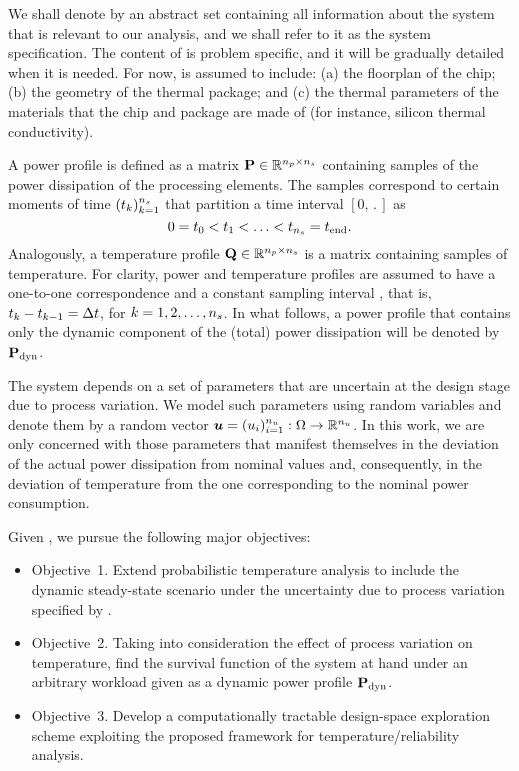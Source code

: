 We shall denote by \spec an abstract set containing all information
about the system that is relevant to our analysis, and we shall refer to it as
the system specification. The content of \spec is problem specific,
and it will be gradually detailed when it is needed. For now, \spec
is assumed to include: (a) the floorplan of the chip; (b) the geometry of the
thermal package; and (c) the thermal parameters of the materials that the chip
and package are made of (for instance, silicon thermal conductivity).

A power profile is defined as a matrix $\mathbf{P} \in \mathbb{R}^{{n_{p}} \times {n_{s}}}$
containing \ns samples of the power dissipation of the processing elements. The
samples correspond to certain moments of time $(t_k)_{k = 1}^{n_{s}}$ that partition
a time interval $[0, \period]$ as
\[
  0 = t_0 < t_1 < \dotsc < t_{n_{s}} = t_\mathrm{end}.
\]
Analogously, a temperature profile $\mathbf{Q} \in \mathbb{R}^{{n_{p}} \times {n_{s}}}$ is a matrix
containing samples of temperature. For clarity, power and temperature profiles
are assumed to have a one-to-one correspondence and a constant sampling interval
\dt, that is, $t_k - t_{k - 1} = \Delta t$, for $k = 1, 2, \dots, {n_{s}}$. In what
follows, a power profile that contains only the dynamic component of the (total)
power dissipation will be denoted by $\mathbf{P}_{\mathrm{dyn}}$.

The system depends on a set of parameters that are uncertain at the design stage
due to process variation. We model such parameters using random variables and
denote them by a random vector $\boldsymbol{u} = (u_i)_{i = 1}^{n_{u}}: \Omega \to \mathbb{R}^{n_{u}}$.
In this work, we are only concerned with those parameters that manifest
themselves in the deviation of the actual power dissipation from nominal values
and, consequently, in the deviation of temperature from the one corresponding to
the nominal power consumption.

Given \spec, we pursue the following major objectives:
\begin{itemize}

  \item Objective~1. Extend probabilistic temperature analysis to include the
  dynamic steady-state scenario under the uncertainty due to process variation
  specified by \vu.

  \item Objective~2. Taking into consideration the effect of process variation
  on temperature, find the survival function of the system at hand under an
  arbitrary workload given as a dynamic power profile $\mathbf{P}_{\mathrm{dyn}}$.

  \item Objective~3. Develop a computationally tractable design-space
  exploration scheme exploiting the proposed framework for
  temperature/reliability analysis.

\end{itemize}

